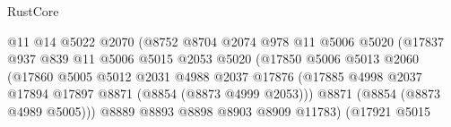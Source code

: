 \begin{lexlean}{RustCore}
\begin{coremodule}
                                            @11
                                            @14
                                            @5022
                                            @2070
                                            (@8752
                                              @8704
                                              @2074
                                              @978
                                              @11
                                              @5006
                                              @5020
                                              (@17837
                                                @937
                                                @839
                                                @11
                                                @5006
                                                @5015
                                                @2053
                                                @5020
                                                (@17850
                                                  @5006
                                                  @5013
                                                  @2060
                                                  (@17860
                                                    @5005
                                                    @5012
                                                    @2031
                                                    @4988
                                                    @2037
                                                    @17876
                                                    (@17885
                                                      @4998
                                                      @2037
                                                      @17894
                                                      @17897
                                                      @8871
                                                      (@8854 (@8873 @4999 @2053)))
                                                    @8871
                                                    (@8854 (@8873 @4989 @5005)))
                                                  @8889
                                                  @8893
                                                  @8898
                                                  @8903
                                                  @8909
                                                  @11783)
                                                (@17921
                                                  @5015

\end{coremodule}
\end{lexlean}
